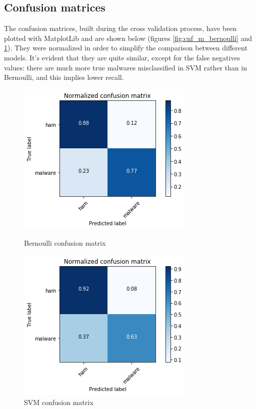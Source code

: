 \documentclass[12pt]{article}
\begin{document}
\subsection{Confusion matrices}
The confusion matrices, built during the cross validation process, have been plotted with MatplotLib and are shown below (figures \ref{fig:cnf_m_bernoulli} and \ref{fig:cnf_m_svm}). They were normalized in order to simplify the comparison between different models. It's evident that they are quite similar, except for the false negatives values: there are much more true malwares misclassified in SVM rather than in Bernoulli, and this implies lower recall. 
\begin{figure}[!ht]
	\centering
	\begin{minipage}{.5\textwidth}
		\centering
		\includegraphics[width=.8\linewidth]{cnf_m_bernoulli.png}
		\caption{Bernoulli confusion matrix} %
		\label{fig:cnf_m_bernoulli}
	\end{minipage}%
	\begin{minipage}{.5\textwidth}
		\centering
		\includegraphics[width=.8\linewidth]{cnf_m_svm.png}
		\caption{SVM confusion matrix} %
		\label{fig:cnf_m_svm}
	\end{minipage}
\end{figure}
\end{document}
